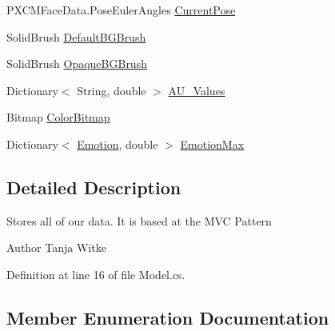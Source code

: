\begin{DoxyCompactItemize}
\item 
P\+X\+C\+M\+Face\+Data.\+Pose\+Euler\+Angles \hyperlink{class_real_sense_1_1_model_a5d30cb7ac89ab7528623a695056096c4}{Current\+Pose}
\item 
Solid\+Brush \hyperlink{class_real_sense_1_1_model_a05161bcafb94b553304268ab16861a84}{Default\+B\+G\+Brush}
\item 
Solid\+Brush \hyperlink{class_real_sense_1_1_model_a14272eb96159aac12a818e2e15c36cb0}{Opaque\+B\+G\+Brush}
\item 
Dictionary$<$ String, double $>$ \hyperlink{class_real_sense_1_1_model_a5a20efa42d5391f0a8156d45f676fc34}{A\+U\+\_\+\+Values}
\item 
Bitmap \hyperlink{class_real_sense_1_1_model_a6b3603d17577660f65fc7bbb6b097182}{Color\+Bitmap}
\item 
Dictionary$<$ \hyperlink{class_real_sense_1_1_model_a5bf3fde8f53519f7a740d8b4e0399208}{Emotion}, double $>$ \hyperlink{class_real_sense_1_1_model_ac5454f63dfead405cd1d9c229cf6790f}{Emotion\+Max}
\end{DoxyCompactItemize}


\subsection{Detailed Description}
Stores all of our data. It is based at the M\+VC Pattern

\begin{DoxyAuthor}{Author}
Tanja Witke 
\end{DoxyAuthor}


Definition at line 16 of file Model.\+cs.



\subsection{Member Enumeration Documentation}
\mbox{\label{class_real_sense_1_1_model_ab1d8b9992dae2162c48b52f6694f946b}} 
